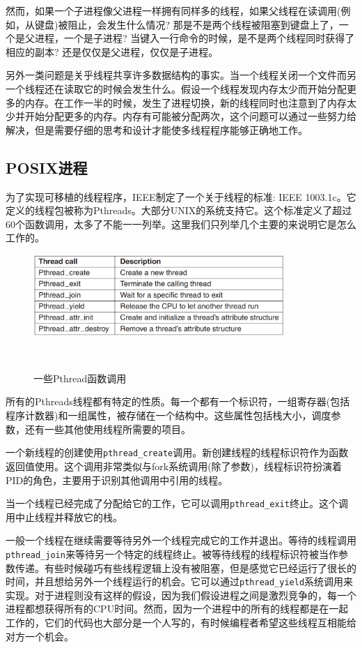 	然而，如果一个子进程像父进程一样拥有同样多的线程，如果父线程在读调用(例如，从键盘)被阻止，会发生什么情况? 那是不是两个线程被阻塞到键盘上了，一个是父进程，一个是子进程? 当键入一行命令的时候，是不是两个线程同时获得了相应的副本? 还是仅仅是父进程，仅仅是子进程。
	
	另外一类问题是关乎线程共享许多数据结构的事实。当一个线程关闭一个文件而另一个线程还在读取它的时候会发生什么。假设一个线程发现内存太少而开始分配更多的内存。在工作一半的时候，发生了进程切换，新的线程同时也注意到了内存太少并开始分配更多的内存。内存有可能被分配两次，这个问题可以通过一些努力给解决，但是需要仔细的思考和设计才能使多线程程序能够正确地工作。
	
	\subsection{POSIX进程}
	
	为了实现可移植的线程程序，IEEE制定了一个关于线程的标准: IEEE 1003.1c。它定义的线程包被称为Pthreads。大部分UNIX的系统支持它。这个标准定义了超过60个函数调用，太多了不能一一列举。这里我们只列举几个主要的来说明它是怎么工作的。
		
	\begin{figure}[ht]\small
		\centering
		\includegraphics[width=0.85\textwidth]{FIG/2-14.png}
		\caption{一些Pthread函数调用}　\label{fig:pthread}
	\end{figure}

	所有的Pthreads线程都有特定的性质。每一个都有一个标识符，一组寄存器(包括程序计数器)和一组属性，被存储在一个结构中。这些属性包括栈大小，调度参数，还有一些其他使用线程所需要的项目。
	
	一个新线程的创建使用\texttt{pthread\_create}调用。新创建线程的线程标识符作为函数返回值使用。这个调用非常类似与fork系统调用(除了参数)，线程标识符扮演着PID的角色，主要用于识别其他调用中引用的线程。
	
	当一个线程已经完成了分配给它的工作，它可以调用\texttt{pthread\_exit}终止。这个调用中止线程并释放它的栈。
	
	一般一个线程在继续需要等待另外一个线程完成它的工作并退出。等待的线程调用\texttt{pthread\_join}来等待另一个特定的线程终止。被等待线程的线程标识符被当作参数传递。有些时候碰巧有些线程逻辑上没有被阻塞，但是感觉它已经运行了很长的时间，并且想给另外一个线程运行的机会。它可以通过\texttt{pthread\_yield}系统调用来实现。对于进程则没有这样的假设，因为我们假设进程之间是激烈竞争的，每一个进程都想获得所有的CPU时间。然而，因为一个进程中的所有的线程都是在一起工作的，它们的代码也大部分是一个人写的，有时候编程者希望这些线程互相能给对方一个机会。
	
